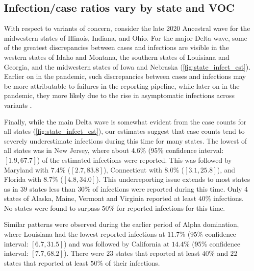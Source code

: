 \subsection{Infection/case ratios vary by state and VOC}
\label{sec:case-infection-ratio}


With respect to variants of concern, consider the late 2020
Ancestral wave for the midwestern states of Illinois, Indiana, and Ohio. For the
major Delta wave, some of the greatest discrepancies between cases and
infections are visible in the western states of Idaho and Montana, the southern
states of Louisiana and Georgia, and the midwestern states of Iowa and Nebraska
(\autoref{fig:state_infect_est}). Earlier on in the pandemic, such discrepancies
between cases and infections may be more attributable to failures in the
reporting pipeline, while later on in the pandemic, they more likely due to the
rise in asymptomatic infections across variants \citep{oph2022covid,
garrett2022high}. 

Finally, while the main Delta wave is somewhat evident from the case counts for
all states (\autoref{fig:state_infect_est}), our estimates suggest that case
counts tend to severely underestimate infections during this time for many
states. The lowest of all states was in New Jersey, where about $4.6\%$ (95\%
confidence interval: $[1.9, 67.7]$) of the estimated infections were reported.
This was followed by Maryland with $7.4\%$ ($[2.7, 83.8]$), Connecticut with
$8.0\%$ ($[3.1, 25.8]$), and Florida with $8.7\%$ ($[4.8, 34.0]$). This
underreporting issue extends to most states as in $39$ states less than $30\%$
of infections were reported during this time. Only $4$ states of Alaska, Maine,
Vermont and Virginia reported at least $40\%$ infections. No states were found
to surpass $50\%$ for reported infections for this time.

Similar patterns were observed during the earlier period of Alpha domination,
where Louisiana had the lowest reported infections at $11.7\%$ (95\% confidence
interval: $[6.7, 31.5]$) and was followed by California at $14.4\%$ (95\%
confidence interval: $[7.7, 68.2]$). There were $23$ states that reported at
least $40\%$ and $22$ states that reported at least $50\%$ of their infections.

